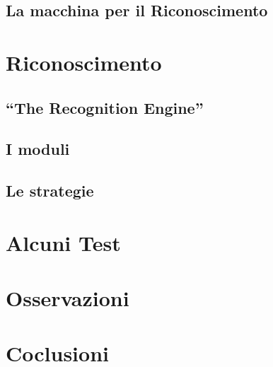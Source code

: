 \documentclass[a4paper,10pt, twocolumn]{article}
\begin{document}
  \subsection{La macchina per il Riconoscimento}
  
\section{Riconoscimento}
  \subsection{``The Recognition Engine''}
  \subsection{I moduli}
  \subsection{Le strategie}
 
\section{Alcuni Test}

\section{Osservazioni}

\section{Coclusioni}


\clearpage

\nocite{*}



\end{document}
